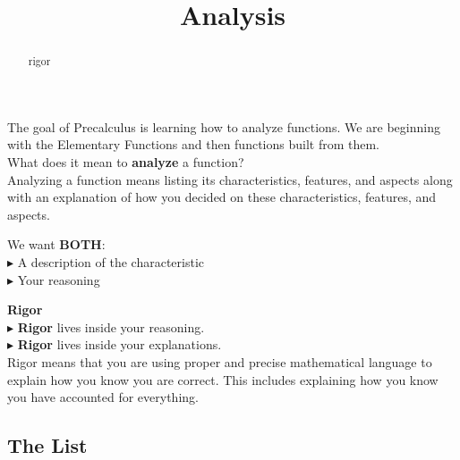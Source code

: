 \documentclass{ximera}
\title{Analysis}
\begin{document}
\begin{abstract}
rigor
\end{abstract}
\maketitle





The goal of Precalculus is learning how to analyze functions.  We are beginning with the Elementary Functions and then functions built from them. \\

What does it mean to \textbf{\textcolor{blue!55!black}{analyze}} a function? \\ 



Analyzing a function means listing its characteristics, features, and aspects along with an explanation of how you decided on these characteristics, features, and aspects.


We want \textbf{BOTH}: \\
\textbf{\textcolor{red!90!darkgray}{$\blacktriangleright$}} A description of the characteristic \\
\textbf{\textcolor{red!90!darkgray}{$\blacktriangleright$}} Your reasoning \\



\begin{definition} \textbf{\textcolor{green!50!black}{Rigor}} \\


\textbf{\textcolor{red!90!darkgray}{$\blacktriangleright$}} \textbf{\textcolor{purple!85!blue}{Rigor}} lives inside your reasoning. \\

\textbf{\textcolor{red!90!darkgray}{$\blacktriangleright$}} \textbf{\textcolor{purple!85!blue}{Rigor}} lives inside your explanations. \\



Rigor means that you are using proper and precise mathematical language to explain how you know you are correct. This includes explaining how you know you have accounted for everything.


\end{definition}



\subsection{The List}
\end{document}
